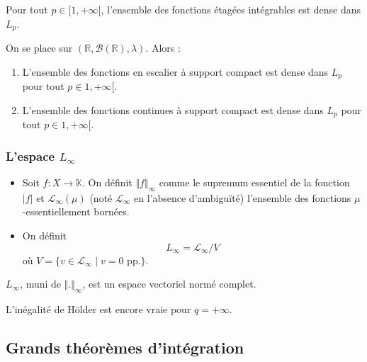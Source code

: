 
  \begin{proposition}
    Pour tout $p \in [1, +\infty[$, l'ensemble des fonctions étagées intégrables est dense dans $L_p$.
  \end{proposition}

  \begin{theorem}
    On se place sur $(\mathbb{R}, \mathcal{B}(\mathbb{R}), \lambda)$. Alors :
    \begin{enumerate}[label=(\roman*)]
      \item L'ensemble des fonctions en escalier à support compact est dense dans $L_p$ pour tout $p \in 1, +\infty[$.
      \item L'ensemble des fonctions continues à support compact est dense dans $L_p$ pour tout $p \in 1, +\infty[$.
    \end{enumerate}
  \end{theorem}

  \subsubsection{L'espace \texorpdfstring{$L_\infty$}{L∞}}


  \begin{definition}
    \begin{itemize}
      \item Soit $f : X \rightarrow \mathbb{K}$. On définit $\Vert f \Vert_\infty$  comme le supremum essentiel de la fonction $\vert f \vert$ et $\mathcal{L}_\infty(\mu)$ (noté $\mathcal{L}_\infty$ en l'absence d'ambiguïté) l'ensemble des fonctions $\mu$-essentiellement bornées.
      \item On définit
      \[ L_\infty = \mathcal{L}_\infty / V \]
      où $V = \{ v \in \mathcal{L}_\infty \mid v = 0 \text{ pp.} \}$.
    \end{itemize}
  \end{definition}

  \begin{theorem}
    $L_\infty$, muni de $\Vert . \Vert_\infty$, est un espace vectoriel normé complet.
  \end{theorem}

  \begin{remark}
    L'inégalité de Hölder est encore vraie pour $q = +\infty$.
  \end{remark}

  \subsection{Grands théorèmes d'intégration}

